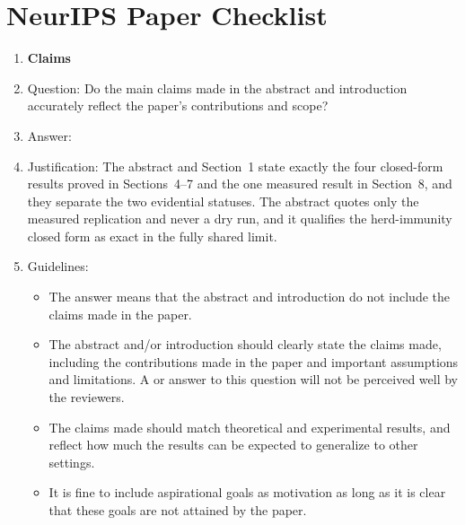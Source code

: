 \section*{NeurIPS Paper Checklist}




\begin{enumerate}

\item {\bf Claims}
    \item[] Question: Do the main claims made in the abstract and introduction accurately reflect the paper's contributions and scope?
    \item[] Answer: \answerYes{}
    \item[] Justification: The abstract and Section~1 state exactly the four closed-form results proved in Sections~4--7 and the one measured result in Section~8, and they separate the two evidential statuses. The abstract quotes only the measured replication and never a dry run, and it qualifies the herd-immunity closed form as exact in the fully shared limit.
    \item[] Guidelines:
    \begin{itemize}
        \item The answer \answerNA{} means that the abstract and introduction do not include the claims made in the paper.
        \item The abstract and/or introduction should clearly state the claims made, including the contributions made in the paper and important assumptions and limitations. A \answerNo{} or \answerNA{} answer to this question will not be perceived well by the reviewers. 
        \item The claims made should match theoretical and experimental results, and reflect how much the results can be expected to generalize to other settings. 
        \item It is fine to include aspirational goals as motivation as long as it is clear that these goals are not attained by the paper. 
    \end{itemize}


\end{enumerate}
